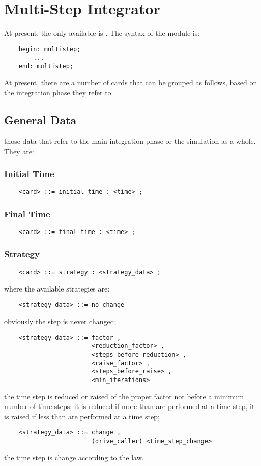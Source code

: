 \section{Multi-Step Integrator}
At present, the only available  is .
The syntax of the module is:
\begin{verbatim}
    begin: multistep;
        ...
    end: multistep;
\end{verbatim}
At present, there are a number of cards that can be grouped as follows, 
based on the integration phase they refer to.

\subsection{General Data}
those data that refer to the main integration phase or the simulation as a
whole. They are:

\subsubsection{Initial Time}
\begin{verbatim}
    <card> ::= initial time : <time> ;
\end{verbatim}

\subsubsection{Final Time}
\begin{verbatim}
    <card> ::= final time : <time> ;
\end{verbatim}

\subsubsection{Strategy}
\begin{verbatim}
    <card> ::= strategy : <strategy_data> ;
\end{verbatim}
where the available strategies are:
\begin{verbatim}
    <strategy_data> ::= no change 
\end{verbatim}
obviously the step is never changed;
\begin{verbatim}
    <strategy_data> ::= factor , 
                        <reduction_factor> ,
                        <steps_before_reduction> ,
                        <raise_factor> ,
                        <steps_before_raise> ,
                        <min_iterations>
\end{verbatim}
the time step is reduced or raised of the proper factor not before a
minimum number of time steps; it is reduced if more than 
 are performed at a time step, it is raised if less
than  are performed at a time step;
\begin{verbatim}
    <strategy_data> ::= change , 
                        (drive_caller) <time_step_change>
\end{verbatim}
the time step is change according to the  law.

